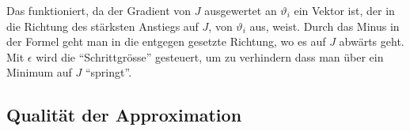 Das funktioniert, da der Gradient von \( J \) ausgewertet an \( \vartheta_i \) ein Vektor ist, der in die Richtung des stärksten Anstiegs auf \( J \), von \(\vartheta_i \) aus, weist.
Durch das Minus in der Formel geht man in die entgegen gesetzte Richtung, wo es auf \( J \) abwärts geht. 
Mit \( \epsilon \) wird die ``Schrittgrösse'' gesteuert, um zu verhindern dass man über ein Minimum auf \( J \) ``springt''.


\subsection{Qualität der Approximation}\label{neuronal:subsection:qualität_nn}
